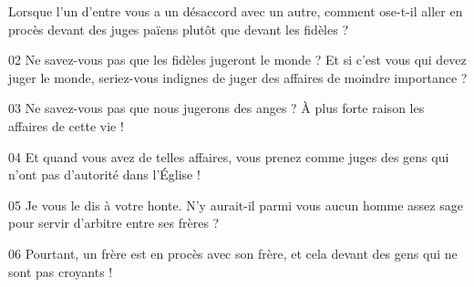 Lorsque l’un d’entre vous a un désaccord avec un autre, comment ose-t-il aller en procès devant des juges païens plutôt que devant les fidèles ?

02 Ne savez-vous pas que les fidèles jugeront le monde ? Et si c’est vous qui devez juger le monde, seriez-vous indignes de juger des affaires de moindre importance ?

03 Ne savez-vous pas que nous jugerons des anges ? À plus forte raison les affaires de cette vie !

04 Et quand vous avez de telles affaires, vous prenez comme juges des gens qui n’ont pas d’autorité dans l’Église !

05 Je vous le dis à votre honte. N’y aurait-il parmi vous aucun homme assez sage pour servir d’arbitre entre ses frères ?

06 Pourtant, un frère est en procès avec son frère, et cela devant des gens qui ne sont pas croyants !
